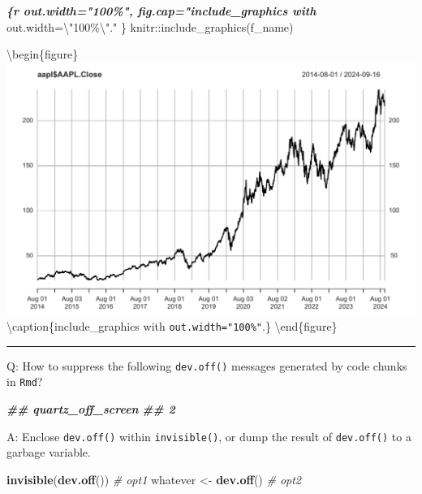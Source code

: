 \documentclass[
  a4paper,
  twoside,
  openright]{book}
\newenvironment{Shaded}{\begin{snugshade}}{\end{snugshade}}
\newcommand{\CommentTok}[1]{\textcolor[rgb]{0.56,0.35,0.01}{\textit{#1}}}
\newcommand{\DocumentationTok}[1]{\textcolor[rgb]{0.56,0.35,0.01}{\textbf{\textit{#1}}}}
\newcommand{\FunctionTok}[1]{\textcolor[rgb]{0.13,0.29,0.53}{\textbf{#1}}}
\newcommand{\InformationTok}[1]{\textcolor[rgb]{0.56,0.35,0.01}{\textbf{\textit{#1}}}}
\newcommand{\NormalTok}[1]{#1}
\newcommand{\OtherTok}[1]{\textcolor[rgb]{0.56,0.35,0.01}{#1}}
\theoremstyle{definition}
\theoremstyle{definition}
\theoremstyle{definition}
\theoremstyle{definition}
\theoremstyle{remark}
\begin{document}
\begin{Shaded}
\begin{Highlighting}[]
\NormalTok{\textasciigrave{}\textasciigrave{}}\InformationTok{\textasciigrave{}\{r out.width="100\%", fig.cap="include\_graphics with \textasciigrave{}}\NormalTok{out.width=\textbackslash{}"100\%\textbackslash{}"\textasciigrave{}." \}}
\NormalTok{knitr::include\_graphics(f\_name) }
\InformationTok{\textasciigrave{}\textasciigrave{}\textasciigrave{}}
\end{Highlighting}
\end{Shaded}

\textbackslash begin\{figure\}
\includegraphics[width=1\linewidth]{images/aapl} \textbackslash caption\{include\_graphics with \texttt{out.width="100\%"}.\}\label{fig:unnamed-chunk-7}
\textbackslash end\{figure\}

\begin{center}\rule{0.5\linewidth}{0.5pt}\end{center}

Q: How to suppress the following \texttt{dev.off()} messages generated by code chunks in \texttt{Rmd}?

\begin{Shaded}
\begin{Highlighting}[]
\DocumentationTok{\#\# quartz\_off\_screen }
\DocumentationTok{\#\#                 2}
\end{Highlighting}
\end{Shaded}

A: Enclose \texttt{dev.off()} within \texttt{invisible()}, or dump the result of \texttt{dev.off()} to a garbage variable.

\begin{Shaded}
\begin{Highlighting}[]
\FunctionTok{invisible}\NormalTok{(}\FunctionTok{dev.off}\NormalTok{())     }\CommentTok{\# opt1}
\NormalTok{whatever }\OtherTok{\textless{}{-}} \FunctionTok{dev.off}\NormalTok{()    }\CommentTok{\# opt2}
\end{Highlighting}
\end{Shaded}
\end{document}
